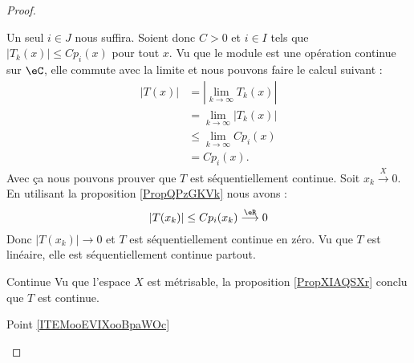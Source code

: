 \begin{proof}
\begin{subproof}
\begin{equation}
		\end{equation}
		Un seul \( i\in J\) nous suffira. Soient donc \( C>0\) et \( i\in I\) tels que \( | T_k(x) |\leq C p_i(x)\) pour tout \( x\). Vu que le module est une opération continue sur \( \eC\), elle commute avec la limite et nous pouvons faire le calcul suivant :
		\begin{subequations}
			\begin{align}
				| T(x) | & =| \lim_{k\to \infty} T_k(x) |  \\
				         & =\lim_{k\to \infty} | T_k(x) |  \\
				         & \leq \lim_{k\to \infty} Cp_i(x) \\
				         & =Cp_i(x).
			\end{align}
		\end{subequations}
		Avec ça nous pouvons prouver que \( T\) est séquentiellement continue. Soit \( x_k\stackrel{X}{\longrightarrow}0\). En utilisant la proposition \ref{PropQPzGKVk} nous avons :
		\begin{equation}
			| T(x_k) |\leq C p_i(x_k)\stackrel{\eR}{\longrightarrow}0
		\end{equation}
		Donc \( | T(x_k) |\to 0\) et \( T\) est séquentiellement continue en zéro. Vu que \( T\) est linéaire, elle est séquentiellement continue partout.
		\item[Continue]
		Vu que l'espace \( X\) est métrisable, la proposition \ref{PropXIAQSXr} conclu que \( T\) est continue.
		\item[Point \ref{ITEMooEVIXooBpaWOc}]


\end{subproof}
\end{proof}
